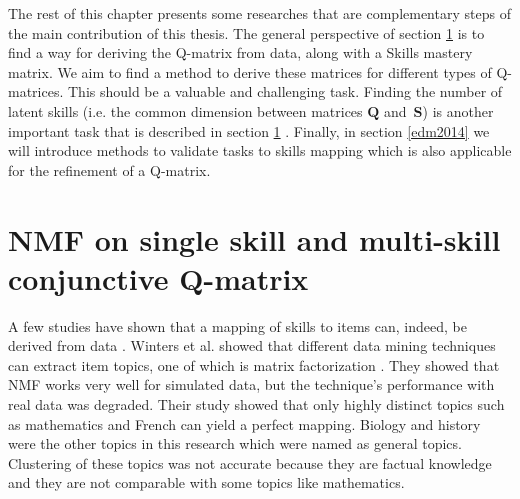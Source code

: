 The rest of this chapter presents some researches that are complementary steps of the main contribution of this thesis. The general perspective of section \ref{ITS2012} is to find a way for deriving the Q-matrix from data, along with a Skills mastery matrix. We aim to find a method to derive these matrices for different types of Q-matrices. This should be a valuable and challenging task. Finding the number of latent skills (i.e. the common dimension between matrices $\mathbf{Q}$ and~$\mathbf{S}$) is another important task that is described in section \ref{ITS2012} . Finally, in section \ref{edm2014} we will introduce methods to validate tasks to skills mapping which is also applicable for the refinement of a Q-matrix.






\section{NMF on single skill and multi-skill conjunctive Q-matrix}
\label{ITS2012}

A few studies have shown that a mapping of skills to items can, indeed, be derived from data \citep{delafayette2006educational,desmarais2011conditions}. Winters et al. showed that different data mining techniques can extract item topics, one of which is matrix factorization \citep{delafayette2006educational}. They showed that NMF works very well for simulated data, but the technique\textquoteright{}s performance with real data was degraded. Their study showed that only highly distinct topics such as mathematics and French can yield a perfect mapping. Biology and history were the other topics in this research which were named as general topics. Clustering of these topics was not accurate because they are factual knowledge and they are not comparable with some topics like mathematics.

